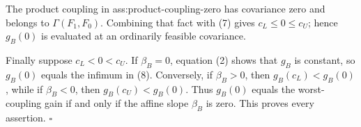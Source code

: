 The product coupling in ass:product-coupling-zero has covariance zero and belongs to \(\Gamma(F_1,F_0)\).  Combining that fact with (7) gives \(c_L\le0\le c_U\); hence \(g_B(0)\) is evaluated at an ordinarily feasible covariance.

Finally suppose \(c_L<0<c_U\).  If \(\beta_B=0\), equation (2) shows that \(g_B\) is constant, so \(g_B(0)\) equals the infimum in (8).  Conversely, if \(\beta_B>0\), then \(g_B(c_L)<g_B(0)\), while if \(\beta_B<0\), then \(g_B(c_U)<g_B(0)\).  Thus \(g_B(0)\) equals the worst-coupling gain if and only if the affine slope \(\beta_B\) is zero.  This proves every assertion. \(\square\)